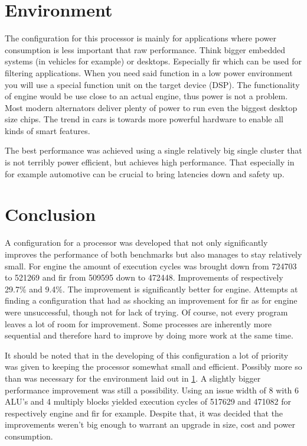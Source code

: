 \section{Environment}
\label{ch:environment}
The configuration for this processor is mainly for applications where power consumption is less important that raw performance.
Think bigger embedded systems (in vehicles for example) or desktops.
Especially fir which can be used for filtering applications.
When you need said function in a low power environment you will use a special function unit on the target device (DSP).
The functionality of engine would be use close to an actual engine, thus power is not a problem.
Most modern alternators deliver plenty of power to run even the biggest desktop size chips.
The trend in cars is towards more powerful hardware to enable all kinds of smart features.

The best performance was achieved using a single relatively big single cluster that is not terribly power efficient, but achieves high performance.
That especially in for example automotive can be crucial to bring latencies down and safety up.

\section{Conclusion}
A configuration for a processor was developed that not only significantly improves the performance of both benchmarks but also manages to stay relatively small. For engine the amount of execution cycles was brought down from 724703 to 521269 and fir from 509595 down to 472448. Improvements of respectively 29.7\% and 9.4\%. The improvement is significantly better for engine. Attempts at finding a configuration that had as shocking an improvement for fir as for engine were unsuccessful, though not for lack of trying. Of course, not every program leaves a lot of room for improvement. Some processes are inherently more sequential and therefore hard to improve by doing more work at the same time.

It should be noted that in the developing of this configuration a lot of priority was given to keeping the processor somewhat small and efficient. Possibly more so than was necessary for the environment laid out in \cref{ch:environment}. A slightly bigger performance improvement was still a possibility. Using an issue width of 8 with 6 ALU's and 4 multiply blocks yielded execution cycles of 517629 and 471082 for respectively engine and fir for example. Despite that, it was decided that the improvements weren't big enough to warrant an upgrade in size, cost and power consumption.